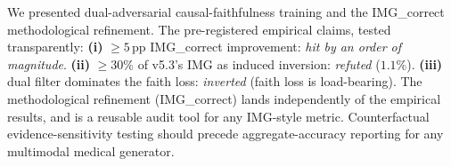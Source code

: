 \documentclass{article}
\begin{document}
We presented dual-adversarial causal-faithfulness training and the
IMG\_correct methodological refinement. The pre-registered
empirical claims, tested transparently: \textbf{(i)} $\geq 5$\,pp
IMG\_correct improvement: \emph{hit by an order of magnitude}.
\textbf{(ii)} $\geq 30\%$ of v5.3's IMG as induced inversion:
\emph{refuted} ($1.1\%$). \textbf{(iii)} dual filter dominates the
faith loss: \emph{inverted} (faith loss is load-bearing). The
methodological refinement (IMG\_correct) lands independently of the
empirical results, and is a reusable audit tool for any IMG-style
metric. Counterfactual evidence-sensitivity testing should precede
aggregate-accuracy reporting for any multimodal medical generator.



\end{document}
